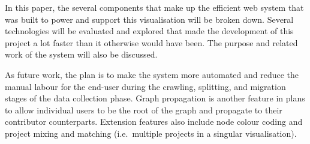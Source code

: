 \documentclass[sigconf]{acmart}
\begin{document}
In this paper,
the several components
that make up the efficient web system that was built to power and support this visualisation will be broken down.
Several technologies will be evaluated and explored
that made the development of this project a lot faster than it otherwise would have been.
The purpose and related work of the system will also be discussed.


As future work,
the plan is to make the system more automated and reduce the manual labour for the end-user during the crawling,
splitting, and migration stages of the data collection phase.
Graph propagation is another feature in plans
to allow individual users to be the root of the graph and propagate to their contributor counterparts.
Extension features also include node colour coding and project mixing and matching
(i.e.\ multiple projects in a singular visualisation).



\end{document}
